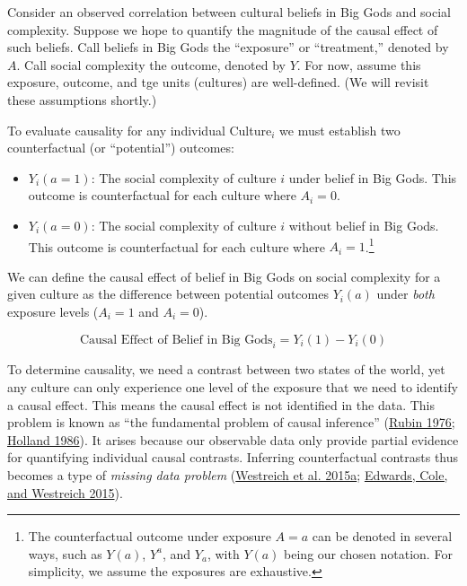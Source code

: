 \documentclass[
  singlecolumn]{report}
\providecommand{\tightlist}{%
  \setlength{\itemsep}{0pt}\setlength{\parskip}{0pt}}\usepackage{longtable,booktabs,array}
\begin{document}
Consider an observed correlation between cultural beliefs in Big Gods
and social complexity. Suppose we hope to quantify the magnitude of the
causal effect of such beliefs. Call beliefs in Big Gods the ``exposure''
or ``treatment,'' denoted by \(A\). Call social complexity the outcome,
denoted by \(Y\). For now, assume this exposure, outcome, and tge units
(cultures) are well-defined. (We will revisit these assumptions
shortly.)

To evaluate causality for any individual Culture\(_i\) we must establish
two counterfactual (or ``potential'') outcomes:

\begin{itemize}
\tightlist
\item
  \(Y_i(a = 1)\): The social complexity of culture \(i\) under belief in
  Big Gods. This outcome is counterfactual for each culture where
  \(A_i = 0\).
\item
  \(Y_i(a = 0)\): The social complexity of culture \(i\) without belief
  in Big Gods. This outcome is counterfactual for each culture where
  \(A_i = 1\).\footnote{The counterfactual outcome under exposure
    \(A = a\) can be denoted in several ways, such as \(Y(a)\),
    \(Y^{a}\), and \(Y_a\), with \(Y(a)\) being our chosen notation. For
    simplicity, we assume the exposures are exhaustive.}
\end{itemize}

We can define the causal effect of belief in Big Gods on social
complexity for a given culture as the difference between potential
outcomes \(Y_i(a)\) under \emph{both} exposure levels (\(A_i = 1\) and
\(A_i = 0\)).

\[
\text{Causal Effect of Belief in Big Gods}_i = Y_i(1) - Y_i(0) 
\]

To determine causality, we need a contrast between two states of the
world, yet any culture can only experience one level of the exposure
that we need to identify a causal effect. This means the causal effect
is not identified in the data. This problem is known as ``the
fundamental problem of causal inference''
(\protect\hyperlink{ref-rubin1976}{Rubin 1976};
\protect\hyperlink{ref-holland1986}{Holland 1986}). It arises because
our observable data only provide partial evidence for quantifying
individual causal contrasts. Inferring counterfactual contrasts thus
becomes a type of \emph{missing data problem}
(\protect\hyperlink{ref-westreich2015}{Westreich et al. 2015a};
\protect\hyperlink{ref-edwards2015}{Edwards, Cole, and Westreich 2015}).
\end{document}
